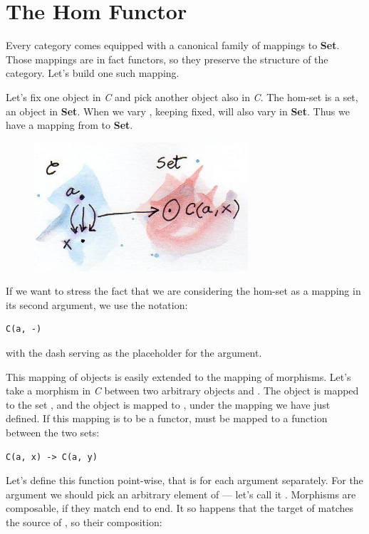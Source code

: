 \section{The Hom Functor}\label{the-hom-functor}

Every category comes equipped with a canonical family of mappings to
\textbf{Set}. Those mappings are in fact functors, so they preserve the
structure of the category. Let's build one such mapping.

Let's fix one object  in \emph{C} and pick another object
 also in \emph{C}. The hom-set  is a set, an
object in \textbf{Set}. When we vary , keeping 
fixed,  will also vary in \textbf{Set}. Thus we have a
mapping from  to \textbf{Set}.

\begin{figure}[H]
\centering
\includegraphics[width=3.12500in]{images/hom-set.jpg}
\end{figure}

\noindent
If we want to stress the fact that we are considering the hom-set as a
mapping in its second argument, we use the notation:

\begin{Verbatim}[commandchars=\\\{\}]
C(a, -)
\end{Verbatim}
with the dash serving as the placeholder for the argument.

This mapping of objects is easily extended to the mapping of morphisms.
Let's take a morphism  in \emph{C} between two arbitrary
objects  and . The object  is mapped to
the set , and the object  is mapped to
, under the mapping we have just defined. If this
mapping is to be a functor,  must be mapped to a function
between the two sets:

\begin{Verbatim}[commandchars=\\\{\}]
C(a, x) -> C(a, y)
\end{Verbatim}
Let's define this function point-wise, that is for each argument
separately. For the argument we should pick an arbitrary element of
 --- let's call it . Morphisms are
composable, if they match end to end. It so happens that the target of
 matches the source of , so their composition:

